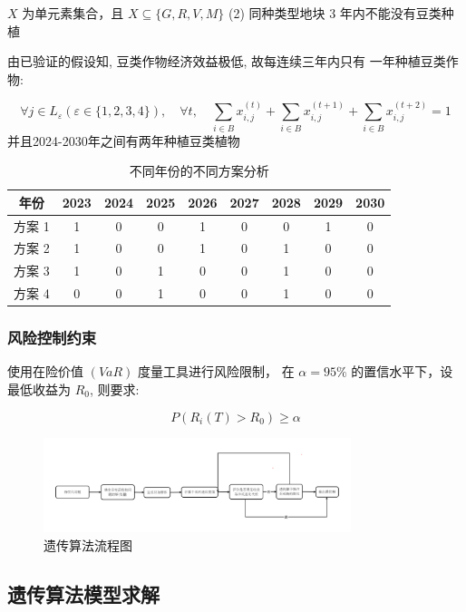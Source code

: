 \documentclass[12pt]{ctexart}
\begin{document}
	$X$ 为单元素集合，且 $X \subseteq\{G, R, V, M\}$
	(2) 同种类型地块 3 年内不能没有豆类种植
	
	由已验证的假设知, 豆类作物经济效益极低, 故每连续三年内只有
	一年种植豆类作物:
	
	\begin{equation}
	\forall j \in L_{\varepsilon}(\varepsilon \in\{1,2,3,4\}), \quad \forall t, \quad \sum_{i \in B} x_{i, j}^{(t)}+\sum_{i \in B} x_{i, j}^{(t+1)}+\sum_{i \in B} x_{i, j}^{(t+2)}=1
	\end{equation}
	并且2024-2030年之间有两年种植豆类植物
	\begin{table}[htbp]
	\centering
	\begin{tabular}{|c|c|c|c|c|c|c|c|c|}
		\hline  
		年份 & 2023 & 2024 & 2025 & 2026 & 2027 & 2028 & 2029 & 2030 \\
		\hline
		方案 1 & 1 & 0 & 0 & 1 & 0 & 0 & 1 & 0 \\
		\hline
		方案 2 & 1 & 0 & 0 & 1 & 0 & 1 & 0 & 0 \\
		\hline
		方案 3 & 1 & 0 & 1 & 0 & 0 & 1 & 0 & 0 \\
		\hline
		方案 4 & 0 & 0 & 1 & 0 & 0 & 1 & 0 & 0 \\
		\hline
	\end{tabular}  
	\caption{不同年份的不同方案分析}
\end{table}
	\subsubsection{风险控制约束}
	
	使用在险价值 $(V a R)$ 度量工具进行风险限制， 在 $\alpha=95 \%$ 的置信水平下，设最低收益为 $R_0$, 则要求:
	
	\begin{equation}
	P\left(R_i(T)>R_0\right) \geq \alpha
	\end{equation}
	
	\begin{figure}[h]
		\centering
		\includegraphics[width=0.8\textwidth]{image19.png}  %
		\caption{遗传算法流程图}
		\label{fig:yield_comparison1}
	\end{figure}
	\subsection{遗传算法模型求解}
\end{document}
